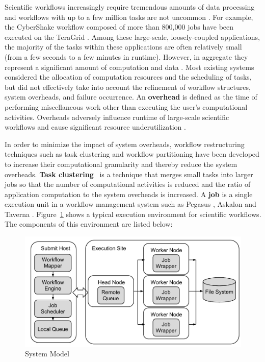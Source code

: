 Scientific workflows increasingly require tremendous amounts of data processing and workflows with up to a few million tasks are not uncommon \cite{Callaghan2011}. For example, the CyberShake workflow \cite{Rynge2012} composed of more than 800,000 jobs have been executed on the TeraGrid \cite{TeraGrid}. Among these large-scale, loosely-coupled applications, the majority of the tasks within these applications are often relatively small (from a few seconds to a few minutes in runtime). However, in aggregate they represent a significant amount of computation and data \cite{Deelman2002}. Most existing systems considered the allocation of computation resources and the scheduling of tasks, but did not effectively take into account the refinement of workflow structures, system overheads, and failure occurrence.
An \textbf{overhead} is defined as the time of performing miscellaneous work other than executing the user's computational activities. Overheads adversely influence runtime of large-scale scientific workflows and cause significant resource underutilization \cite{Chen2011}. 

In order to minimize the impact of system overheads, workflow restructuring techniques such as task clustering \cite{Singh2008,Hussin2010,Zhao2009} and workflow partitioning \cite{Kumar2002, Hedayat2009} have been developed to increase their computational granularity and thereby reduce the system overheads. \textbf{Task clustering}~\cite{Singh2008} is a technique that merges small tasks into larger jobs so that the number of computational activities is reduced and the ratio of application computation to the system overheads is increased. A \textbf{job} is a single execution unit in a workflow management system such as Pegasus \cite{Deelman2004}, Askalon \cite{Ostermann2009b} and Taverna \cite{Calasanz2008}. 
Figure~\ref{fig:intro_system} shows a typical execution environment for scientific workflows. The components of this environment are listed below: 

\begin{figure}[h!]
\centering
  \includegraphics[width=0.7\linewidth]{figures/model/model.pdf}
  \caption{System Model}
  \label{fig:intro_system}
\end{figure}

